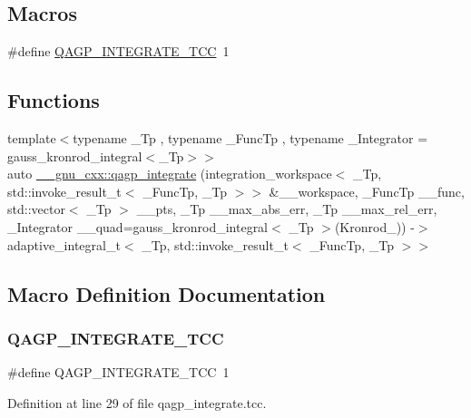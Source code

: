 \subsection*{Macros}
\begin{DoxyCompactItemize}
\item 
\#define \hyperlink{qagp__integrate_8tcc_a169e97951b2784b3a8523124af652c2b}{Q\+A\+G\+P\+\_\+\+I\+N\+T\+E\+G\+R\+A\+T\+E\+\_\+\+T\+CC}~1
\end{DoxyCompactItemize}
\subsection*{Functions}
\begin{DoxyCompactItemize}
\item 
{\footnotesize template$<$typename \+\_\+\+Tp , typename \+\_\+\+Func\+Tp , typename \+\_\+\+Integrator  = gauss\+\_\+kronrod\+\_\+integral$<$\+\_\+\+Tp$>$$>$ }\\auto \hyperlink{namespace____gnu__cxx_adf59cfc2db130a9f92d68887e71bbd5f}{\+\_\+\+\_\+gnu\+\_\+cxx\+::qagp\+\_\+integrate} (integration\+\_\+workspace$<$ \+\_\+\+Tp, std\+::invoke\+\_\+result\+\_\+t$<$ \+\_\+\+Func\+Tp, \+\_\+\+Tp $>$$>$ \&\+\_\+\+\_\+workspace, \+\_\+\+Func\+Tp \+\_\+\+\_\+func, std\+::vector$<$ \+\_\+\+Tp $>$ \+\_\+\+\_\+pts, \+\_\+\+Tp \+\_\+\+\_\+max\+\_\+abs\+\_\+err, \+\_\+\+Tp \+\_\+\+\_\+max\+\_\+rel\+\_\+err, \+\_\+\+Integrator \+\_\+\+\_\+quad=gauss\+\_\+kronrod\+\_\+integral$<$ \+\_\+\+Tp $>$(Kronrod\+\_)) -\/$>$ adaptive\+\_\+integral\+\_\+t$<$ \+\_\+\+Tp, std\+::invoke\+\_\+result\+\_\+t$<$ \+\_\+\+Func\+Tp, \+\_\+\+Tp $>$$>$
\end{DoxyCompactItemize}


\subsection{Macro Definition Documentation}
\mbox{\label{qagp__integrate_8tcc_a169e97951b2784b3a8523124af652c2b}} 
\subsubsection{\texorpdfstring{Q\+A\+G\+P\+\_\+\+I\+N\+T\+E\+G\+R\+A\+T\+E\+\_\+\+T\+CC}{QAGP\_INTEGRATE\_TCC}}
{\footnotesize\ttfamily \#define Q\+A\+G\+P\+\_\+\+I\+N\+T\+E\+G\+R\+A\+T\+E\+\_\+\+T\+CC~1}



Definition at line 29 of file qagp\+\_\+integrate.\+tcc.


